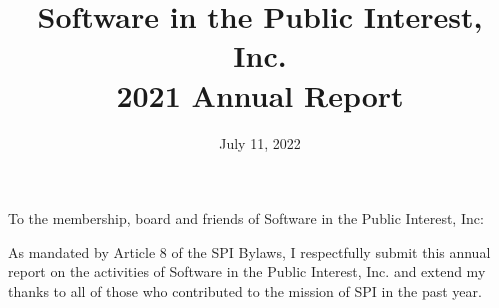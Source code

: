 \documentclass[a4paper]{report}
\begin{document}
\title{Software in the Public Interest, Inc.\\
2021 Annual Report}
\date{July 11, 2022}

\maketitle

\newpage


\hspace{1em}

To the membership, board and friends of Software in the Public Interest, Inc:

As mandated by Article 8 of the SPI Bylaws, I respectfully submit this annual report on the activities of Software in the Public Interest, Inc. and extend my thanks to all of those who contributed to the mission of SPI in the past year.
\end{document}
